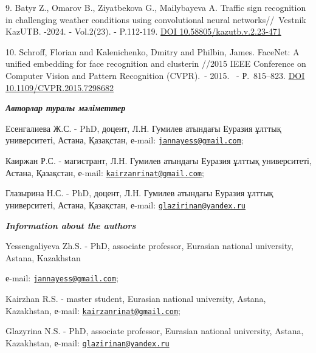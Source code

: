 9. Batyr Z., Omarov B., Ziyatbekova G., Mailybayeva A. Traffic sign
recognition in challenging weather conditions using convolutional neural
networks//~Vestnik KazUTB. -2024. - Vol.2(23). - P.112-119.
\href{https://doi.org/10.58805/kazutb.v.2.23-471}{DOI
10.58805/kazutb.v.2.23-471}

10. Schroff, Florian and Kalenichenko, Dmitry and Philbin, James.
FaceNet: A unified embedding for face recognition and clusterin //2015
IEEE Conference on Computer Vision and Pattern Recognition (CVPR).~-
2015. ~- Р.~815--823.
\href{https://doi.org/10.1109/CVPR.2015.7298682}{DOI
10.1109/CVPR.2015.7298682}

\emph{{\bfseries Авторлар туралы мәліметтер}}

Есенгалиева Ж.С. - PhD, доцент, Л.Н. Гумилев атындағы Еуразия ұлттық
университеті, Астана, Қазақстан, е-mail:
\href{mailto:jannayess@gmail.com}{\nolinkurl{jannayess@gmail.com}};

Каиржан Р.С. - магистрант, Л.Н. Гумилев атындағы Еуразия ұлттық
университеті, Астана, Қазақстан, е-mail:
\href{mailto:kairzanrinat@gmail.com}{\nolinkurl{kairzanrinat@gmail.com}};

Глазырина Н.С. - PhD, доцент, Л.Н. Гумилев атындағы Еуразия ұлттық
университеті, Астана, Қазақстан, е-mail:
\href{mailto:glazirinan@yandex.ru}{\nolinkurl{glazirinan@yandex.ru}}

\emph{{\bfseries Information about the authors}}

Yessengaliyeva Zh.S. - PhD, associate professor, Eurasian national
university, Astana, Kazakhstan

е-mail:
\href{mailto:jannayess@gmail.com}{\nolinkurl{jannayess@gmail.com}};

Kairzhan R.S. - master student, Eurasian national university, Astana,
Kazakhstan, е-mail:
\href{mailto:kairzanrinat@gmail.com}{\nolinkurl{kairzanrinat@gmail.com}};

Glazyrina N.S. - PhD, associate professor, Eurasian national university,
Astana, Kazakhstan, е-mail:
\href{mailto:glazirinan@yandex.ru}{\nolinkurl{glazirinan@yandex.ru}}\
